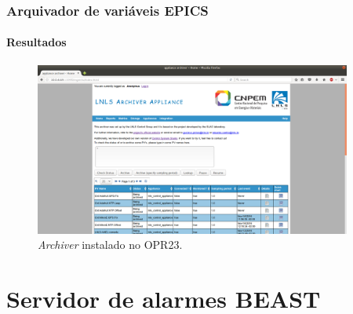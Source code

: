 \documentclass{beamer}
\begin{document}
\begin{frame}
\frametitle {Arquivador de variáveis EPICS}
\framesubtitle{Resultados}

\begin{figure}[h]

\centering
\includegraphics[width=0.93\textwidth]{image/archiver}
\caption {\textit{Archiver} instalado no OPR23.}
\label{fig:archiver}
\end{figure}

\end{frame}

\section {Servidor de alarmes BEAST}
\end{document}
